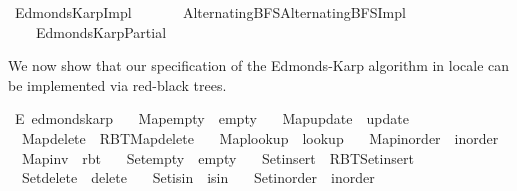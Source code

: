 %
\begin{isabellebody}%
%
%
\isadelimtheory
%
\endisadelimtheory
%
\isatagtheory
{}\isamarkupfalse%
\ Edmonds{\isacharunderscore}{\kern0pt}Karp{\isacharunderscore}{\kern0pt}Impl\isanewline
\ \ \isanewline
\ \ \ \ {\isachardoublequoteopen}{\isachardot}{\kern0pt}{\isachardot}{\kern0pt}{\isacharslash}{\kern0pt}Alternating{\isacharunderscore}{\kern0pt}BFS{\isacharslash}{\kern0pt}Alternating{\isacharunderscore}{\kern0pt}BFS{\isacharunderscore}{\kern0pt}Impl{\isachardoublequoteclose}\isanewline
\ \ \ \ Edmonds{\isacharunderscore}{\kern0pt}Karp{\isacharunderscore}{\kern0pt}Partial\isanewline
{}%
\endisatagtheory
{\isafoldtheory}%
%
\isadelimtheory
%
\endisadelimtheory
%
\begin{isamarkuptext}%
We now show that our specification of the Edmonds-Karp algorithm in locale 
can be implemented via red-black trees.%
\end{isamarkuptext}\isamarkuptrue%
\isamarkupfalse%
\ E{\isacharcolon}{\kern0pt}\ edmonds{\isacharunderscore}{\kern0pt}karp\ \isanewline
\ \ Map{\isacharunderscore}{\kern0pt}empty\ {\isacharequal}{\kern0pt}\ empty\ \isanewline
\ \ Map{\isacharunderscore}{\kern0pt}update\ {\isacharequal}{\kern0pt}\ update\ \isanewline
\ \ Map{\isacharunderscore}{\kern0pt}delete\ {\isacharequal}{\kern0pt}\ RBT{\isacharunderscore}{\kern0pt}Map{\isachardot}{\kern0pt}delete\ \isanewline
\ \ Map{\isacharunderscore}{\kern0pt}lookup\ {\isacharequal}{\kern0pt}\ lookup\ \isanewline
\ \ Map{\isacharunderscore}{\kern0pt}inorder\ {\isacharequal}{\kern0pt}\ inorder\ \isanewline
\ \ Map{\isacharunderscore}{\kern0pt}inv\ {\isacharequal}{\kern0pt}\ rbt\ \isanewline
\ \ Set{\isacharunderscore}{\kern0pt}empty\ {\isacharequal}{\kern0pt}\ empty\ \isanewline
\ \ Set{\isacharunderscore}{\kern0pt}insert\ {\isacharequal}{\kern0pt}\ RBT{\isacharunderscore}{\kern0pt}Set{\isachardot}{\kern0pt}insert\ \isanewline
\ \ Set{\isacharunderscore}{\kern0pt}delete\ {\isacharequal}{\kern0pt}\ delete\ \isanewline
\ \ Set{\isacharunderscore}{\kern0pt}isin\ {\isacharequal}{\kern0pt}\ isin\ \isanewline
\ \ Set{\isacharunderscore}{\kern0pt}inorder\ {\isacharequal}{\kern0pt}\ inorder\ \isanewline

\end{isabellebody}
